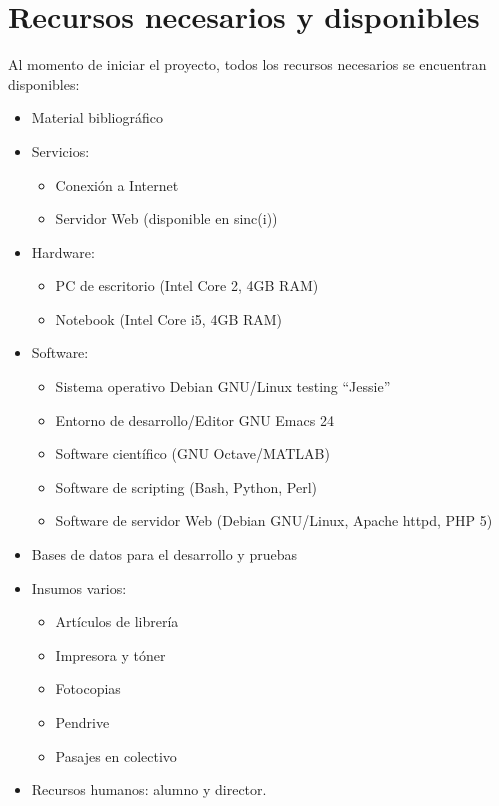 \documentclass[12pt,bibliography=oldstyle,DIV=14,parskip=full-,titlepage]{scrartcl}
\begin{document}
\section{Recursos necesarios y disponibles}
Al momento de iniciar el proyecto, todos los recursos necesarios se
encuentran disponibles:
\begin{itemize}
\item Material bibliográfico
\item Servicios:
  \begin{itemize}
  \item Conexión a Internet
  \item Servidor Web (disponible en sinc(i))
  \end{itemize}
\item Hardware:
  \begin{itemize}
  \item PC de escritorio (Intel Core 2, 4GB RAM)
  \item Notebook (Intel Core i5, 4GB RAM)
  \end{itemize}
\item Software:
  \begin{itemize}
  \item Sistema operativo Debian GNU/Linux testing ``Jessie''
  \item Entorno de desarrollo/Editor GNU Emacs 24
  \item Software científico (GNU Octave/MATLAB)
  \item Software de scripting (Bash, Python, Perl)
  \item Software de servidor Web (Debian GNU/Linux, Apache
    httpd, PHP 5)
  \end{itemize}
\item Bases de datos para el desarrollo y pruebas
\item Insumos varios:
  \begin{itemize}
  \item Artículos de librería
  \item Impresora y tóner
  \item Fotocopias
  \item Pendrive
  \item Pasajes en colectivo
  \end{itemize}
\item Recursos humanos: alumno y director.
\end{itemize}
%
%
\end{document}
